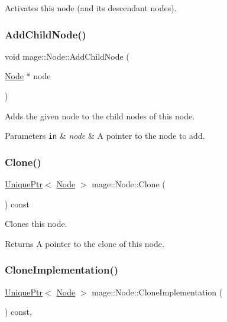 Activates this node (and its descendant nodes). \hypertarget{classmage_1_1_node_a465b80fbebf01543c645603cfe3e1b7e}{}\label{classmage_1_1_node_a465b80fbebf01543c645603cfe3e1b7e} 
\subsubsection{\texorpdfstring{Add\+Child\+Node()}{AddChildNode()}}
{\footnotesize\ttfamily void mage\+::\+Node\+::\+Add\+Child\+Node (\begin{DoxyParamCaption}\item[{\hyperlink{classmage_1_1_node}{Node} $\ast$}]{node }\end{DoxyParamCaption})}

Adds the given node to the child nodes of this node.


\begin{DoxyParams}[1]{Parameters}
\mbox{\tt in}  & {\em node} & A pointer to the node to add. \\
\hline
\end{DoxyParams}
\hypertarget{classmage_1_1_node_a18e08151571435d319be2414474c93c0}{}\label{classmage_1_1_node_a18e08151571435d319be2414474c93c0} 
\subsubsection{\texorpdfstring{Clone()}{Clone()}}
{\footnotesize\ttfamily \hyperlink{namespacemage_a3316d7143a973e37adf1110f2e80ca31}{Unique\+Ptr}$<$ \hyperlink{classmage_1_1_node}{Node} $>$ mage\+::\+Node\+::\+Clone (\begin{DoxyParamCaption}{ }\end{DoxyParamCaption}) const}

Clones this node.

\begin{DoxyReturn}{Returns}
A pointer to the clone of this node. 
\end{DoxyReturn}
\hypertarget{classmage_1_1_node_a71a4763bfd4cba5653488b490e61dc8f}{}\label{classmage_1_1_node_a71a4763bfd4cba5653488b490e61dc8f} 
\subsubsection{\texorpdfstring{Clone\+Implementation()}{CloneImplementation()}}
{\footnotesize\ttfamily \hyperlink{namespacemage_a3316d7143a973e37adf1110f2e80ca31}{Unique\+Ptr}$<$ \hyperlink{classmage_1_1_node}{Node} $>$ mage\+::\+Node\+::\+Clone\+Implementation (\begin{DoxyParamCaption}{ }\end{DoxyParamCaption}) const\hspace{0.3cm}{\ttfamily [private]}, {\ttfamily [virtual]}}

